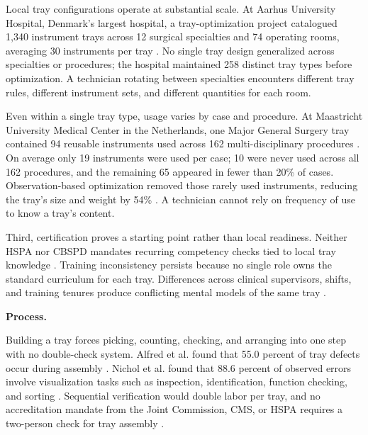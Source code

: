 \documentclass[10pt,a4paper]{article}
\begin{document}
Local tray configurations operate at substantial scale. At Aarhus University Hospital, Denmark's largest hospital, a tray-optimization project catalogued 1,340 instrument trays across 12 surgical specialties and 74 operating rooms, averaging 30 instruments per tray \cite{rubak-et-al-2024}. No single tray design generalized across specialties or procedures; the hospital maintained 258 distinct tray types before optimization. A technician rotating between specialties encounters different tray rules, different instrument sets, and different quantities for each room.

Even within a single tray type, usage varies by case and procedure. At Maastricht University Medical Center in the Netherlands, one Major General Surgery tray contained 94 reusable instruments used across 162 multi-disciplinary procedures \cite{eussen-et-al-2026}. On average only 19 instruments were used per case; 10 were never used across all 162 procedures, and the remaining 65 appeared in fewer than 20\% of cases. Observation-based optimization removed those rarely used instruments, reducing the tray's size and weight by 54\% \cite{eussen-et-al-2026}. A technician cannot rely on frequency of use to know a tray's content.

Third, certification proves a starting point rather than local readiness.
Neither HSPA nor CBSPD mandates recurring competency checks tied to local tray
knowledge
\cite{hspa-crcst-accessed-2026, ofstead-et-al-2023, aorn-staffing-shortage-2025, kovach-2012, nadeau-2017}. Training inconsistency
persists because no single role owns the standard curriculum for each tray.
Differences across clinical supervisors, shifts, and training tenures produce conflicting
mental models of the same tray
\cite{alfred-et-al-2021, hu-et-al-2024, thurmond-2020, lind-2026b}.

\textbf{Process.}

Building a tray forces picking, counting, checking, and arranging into one step
with no double-check system. Alfred et al. found that 55.0 percent of tray
defects occur during assembly
\cite{alfred-et-al-2021}. Nichol et al. found that
88.6 percent of observed errors involve visualization tasks such as inspection,
identification, function checking, and sorting
\cite{nichol-et-al-2024}. Sequential
verification would double labor per tray, and no accreditation mandate from the
Joint Commission, CMS, or HSPA requires a two-person check for tray assembly
\cite{alfred-et-al-2021, chen-et-al-2023, pelzer-et-al-2024}.
\end{document}

